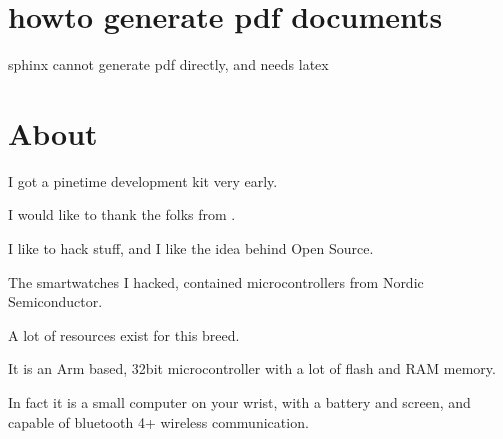 \documentclass[letterpaper,10pt,english]{sphinxmanual}
\begin{document}
\chapter{howto generate pdf documents}
\label{\detokenize{latexpdf:howto-generate-pdf-documents}}\label{\detokenize{latexpdf::doc}}
sphinx cannot generate pdf directly, and needs latex

\begin{sphinxVerbatim}[commandchars=\\\{\}]
  
  
  
  
  
  
\end{sphinxVerbatim}


\chapter{About}
\label{\detokenize{about:about}}\label{\detokenize{about::doc}}
I got a pinetime development kit very early.

I would like to thank the folks from .

I like to hack stuff, and I like the idea behind Open Source.

The smartwatches I hacked, contained microcontrollers from Nordic Semiconductor.

A lot of resources exist for this breed.

It is an Arm based, 32bit microcontroller with a lot of flash and RAM memory.

In fact it is a small computer on your wrist, with a battery and screen, and capable of bluetooth 4+ wireless communication.

\begin{sphinxVerbatim}[commandchars=\\\{\}]
        
           
\end{sphinxVerbatim}
\end{document}
